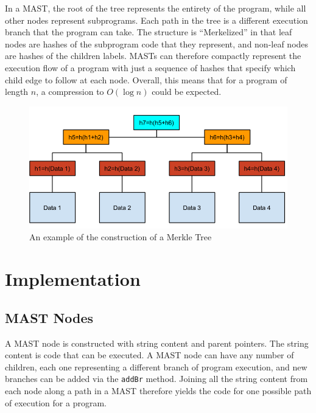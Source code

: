 \documentclass{vldb}
\begin{document}
In a MAST, the root of the tree represents the entirety of the program, while
all other nodes represent subprograms. Each path in the tree is a different
execution branch that the program can take. The structure is ``Merkelized'' in
that leaf nodes are hashes of the subprogram code that they represent, and
non-leaf nodes are hashes of the children labels. MASTs can therefore compactly
represent the execution flow of a program with just a sequence of hashes that
specify which child edge to follow at each node. Overall, this means that for
a program of length $n$, a compression to $O(\log{}n)$ could be expected.


\begin{figure}[h]
	\includegraphics[scale=.4]{merkle_tree}
	\caption{An example of the construction of a Merkle Tree}
	\label{merkle}
\end{figure}

\section{Implementation}

\subsection{MAST Nodes}

A MAST node is constructed with string content and parent pointers.
The string content is code that can be executed. A MAST node can have
any number of children, each one representing a different branch of program
execution, and new branches can be added via the \texttt{addBr} method. Joining all the
string content from each node along a path in a MAST therefore yields the code
for one possible path of execution for a program.
 
\end{document}
